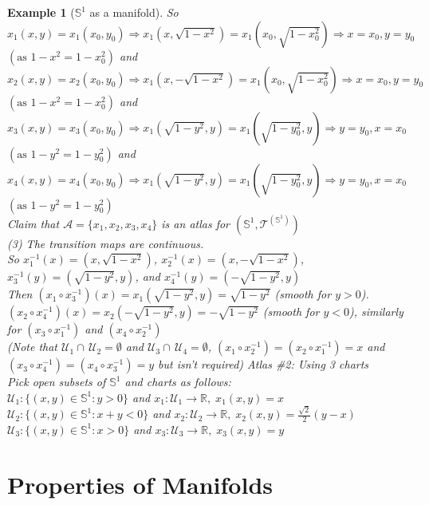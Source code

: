 \documentclass[11pt]{report}
\theoremstyle{thm}
\newtheorem{example}{Example}
\begin{document}
\begin{example}[$\mathbb{S}^1$ as a manifold]
So $x_1(x,y)=x_1(x_0, y_0) \Rightarrow x_1(x, \sqrt{1-x^2})=x_1(x_0, \sqrt{1-x_0^2}) \Rightarrow x=x_0,y=y_0$ $(\text{as } 1-x^2=1-x_0^2) $
and $x_2(x,y)=x_2(x_0, y_0) \Rightarrow x_1(x, -\sqrt{1-x^2})=x_1(x_0, \sqrt{1-x_0^2}) \Rightarrow x=x_0,y=y_0$ $(\text{as } 1-x^2=1-x_0^2) $
and $x_3(x,y)=x_3(x_0, y_0) \Rightarrow x_1(\sqrt{1-y^2}, y)=x_1(\sqrt{1-y_0^2}, y) \Rightarrow y=y_0,x=x_0$ $(\text{as } 1-y^2=1-y_0^2) $
and $x_4(x,y)=x_4(x_0, y_0) \Rightarrow x_1(\sqrt{1-y^2}, y)=x_1(\sqrt{1-y_0^2}, y) \Rightarrow y=y_0,x=x_0$ $(\text{as } 1-y^2=1-y_0^2) $\\[1em]
Claim that $\mathcal{A} =\{x_1, x_2, x_3, x_4\}$ is an atlas for $(\mathbb{S}^1, \mathcal{T}^{(\mathbb{S}^1)})$\\[1em]
(3) The transition maps are continuous.\\[1em]
So $x_1^{-1}(x)=(x,\sqrt{1-x^2})$,
$x_2^{-1}(x)=(x,-\sqrt{1-x^2})$,
$x_3^{-1}(y)=(\sqrt{1-y^2},y)$, and 
$x_4^{-1}(y)=(-\sqrt{1-y^2},y)$\\[1em]
Then $(x_1 \circ x_3^{-1})(x)=x_1(\sqrt{1-y^2}, y)=\sqrt{1-y^2}$ (smooth for $y>0$).\\[1em]
$(x_2 \circ x_4^{-1})(x)=x_2(-\sqrt{1-y^2}, y)=-\sqrt{1-y^2}$ (smooth for $y<0$), similarly for $(x_3 \circ x_1^{-1})$ and $(x_4 \circ x_2^{-1})$\\[1em]
(Note that $\mathcal{U}_1\cap\,\mathcal{U}_2 =\emptyset$ and $\mathcal{U}_3\cap\,\mathcal{U}_4 =\emptyset$, $(x_1 \circ x_2^{-1})=(x_2 \circ x_1^{-1})=x$ and $(x_3 \circ x_4^{-1})=(x_4 \circ x_3^{-1})=y$ but isn't required)
\newpage\noindent
\textit{Atlas \#2: Using 3 charts}\\[1em]
Pick open subsets of $\mathbb{S}^1$ and charts as follows:\\
$\mathcal{U}_1: \{(x,y)\in \mathbb{S}^1: y > 0 \}$ and $ x_1: \mathcal{U}_1 \rightarrow \mathbb{R},\; x_1(x,y)= x$\\
$\mathcal{U}_2: \{(x,y)\in \mathbb{S}^1: x+y < 0 \}$ and $ x_2: \mathcal{U}_2 \rightarrow \mathbb{R},\; x_2(x,y)= \frac{\sqrt{2}}{2}(y-x)$\\
$\mathcal{U}_3: \{(x,y)\in \mathbb{S}^1: x > 0 \}$ and $ x_3: \mathcal{U}_3 \rightarrow \mathbb{R},\; x_3(x,y)= y$\\[1em]
\end{example}
\newpage\noindent
\section{Properties of Manifolds}
\end{document}
